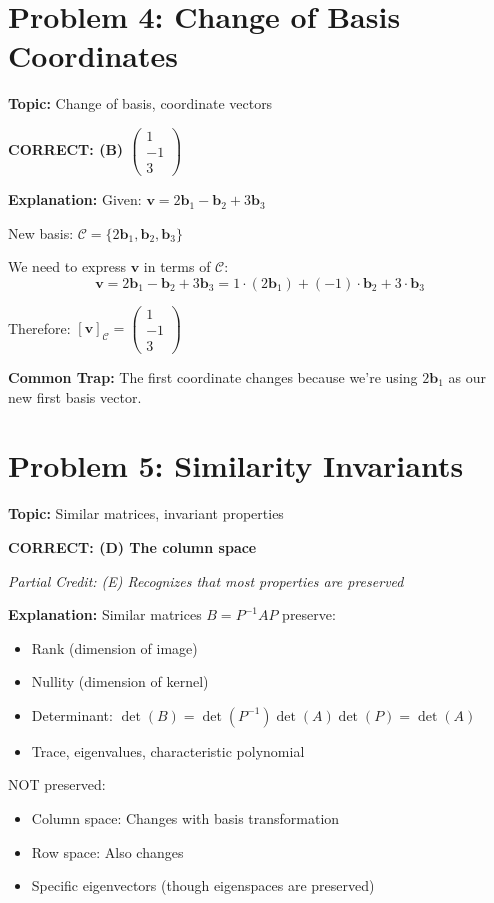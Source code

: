 \documentclass[12pt]{amsart}
\newcommand{\correct}[1]{{\color{blue}\textbf{CORRECT: #1}}}
\newcommand{\partcred}[1]{{\color{red}\textit{Partial Credit: #1}}}
\newcommand{\trap}{\textbf{Common Trap: }}
\begin{document}
\section*{Problem 4: Change of Basis Coordinates}
\textbf{Topic:} Change of basis, coordinate vectors

\correct{(B) $\begin{pmatrix} 1 \\ -1 \\ 3 \end{pmatrix}$}

\textbf{Explanation:} 
Given: $\mathbf{v} = 2\mathbf{b}_1 - \mathbf{b}_2 + 3\mathbf{b}_3$

New basis: $\mathcal{C} = \{2\mathbf{b}_1, \mathbf{b}_2, \mathbf{b}_3\}$

We need to express $\mathbf{v}$ in terms of $\mathcal{C}$:
$$\mathbf{v} = 2\mathbf{b}_1 - \mathbf{b}_2 + 3\mathbf{b}_3 = 1 \cdot (2\mathbf{b}_1) + (-1) \cdot \mathbf{b}_2 + 3 \cdot \mathbf{b}_3$$

Therefore: $[\mathbf{v}]_{\mathcal{C}} = \begin{pmatrix} 1 \\ -1 \\ 3 \end{pmatrix}$

\trap The first coordinate changes because we're using $2\mathbf{b}_1$ as our new first basis vector.

\hrulefill

\section*{Problem 5: Similarity Invariants}
\textbf{Topic:} Similar matrices, invariant properties

\correct{(D) The column space}

\partcred{(E) Recognizes that most properties are preserved}

\textbf{Explanation:} 
Similar matrices $B = P^{-1}AP$ preserve:
\begin{itemize}
\item Rank (dimension of image)
\item Nullity (dimension of kernel)
\item Determinant: $\det(B) = \det(P^{-1})\det(A)\det(P) = \det(A)$
\item Trace, eigenvalues, characteristic polynomial
\end{itemize}

NOT preserved:
\begin{itemize}
\item Column space: Changes with basis transformation
\item Row space: Also changes
\item Specific eigenvectors (though eigenspaces are preserved)
\end{itemize}
\end{document}
